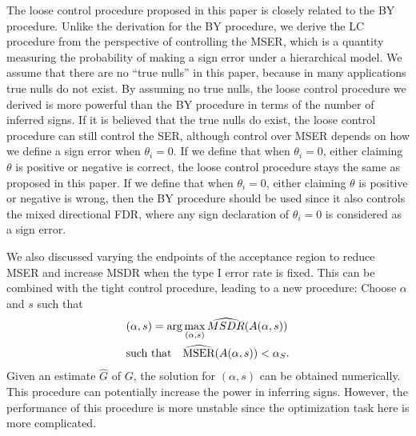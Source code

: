 \documentclass[11pt]{article}
\begin{document}
The loose control procedure proposed in this paper is closely related to the BY procedure. Unlike the derivation for the BY procedure, we derive the LC procedure from the perspective of controlling the MSER, which is a quantity measuring the probability of making a sign error under a hierarchical model. We assume that there are no ``true nulls'' in this paper, because in many applications true nulls do not exist. By assuming no true nulls, the loose control procedure we derived is more powerful than the BY procedure in terms of the number of inferred signs. If it is believed that the true nulls do exist, the loose control procedure can still control the SER, although control over MSER depends on how we define a sign error when $\theta_i = 0$. If we define that when $\theta_i=0$, either claiming $\theta$ is positive or negative is correct, the loose control procedure stays the same as proposed in this paper. If we define that when $\theta_i=0$, either claiming $\theta$ is positive or negative is wrong, then the BY procedure should be used since it also controls the mixed directional FDR, where any sign declaration of $\theta_i =0$ is considered as a sign error.


We also discussed varying the endpoints of the acceptance region to reduce MSER and increase MSDR when the type I error rate is fixed. This can be combined with the tight control procedure, leading to a new procedure: Choose $\alpha$ and $s$ such that 
\begin{equation*}
	\begin{split}
		& (\alpha,s) = \arg \max_{(\alpha, s)} \widehat{MSDR}(A(\alpha,s)) \\
		& \text{such that\quad} \widehat{\text{MSER}}(A(\alpha,s)) < \alpha_S.
	\end{split}
\end{equation*}
Given an estimate $\hat G$ of $G$, the solution for $(\alpha, s)$ can be obtained numerically. This procedure can potentially increase the power in inferring signs. However, the performance of this procedure is more unstable since the optimization task here is more complicated.
\end{document}
